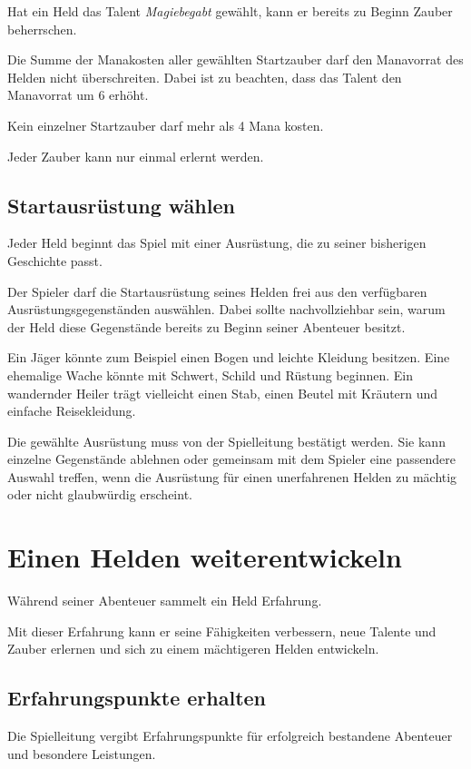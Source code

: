 Hat ein Held das Talent \emph{Magiebegabt} gewählt, kann er bereits zu Beginn Zauber beherrschen.

Die Summe der Manakosten aller gewählten Startzauber darf den Manavorrat des Helden nicht überschreiten. Dabei ist zu beachten, dass das Talent den Manavorrat um 6 erhöht.

Kein einzelner Startzauber darf mehr als 4 Mana kosten.

Jeder Zauber kann nur einmal erlernt werden.

\subsection{Startausrüstung wählen}

Jeder Held beginnt das Spiel mit einer Ausrüstung, die zu seiner bisherigen Geschichte passt.

Der Spieler darf die Startausrüstung seines Helden frei aus den verfügbaren Ausrüstungsgegenständen auswählen. Dabei sollte nachvollziehbar sein, warum der Held diese Gegenstände bereits zu Beginn seiner Abenteuer besitzt.

Ein Jäger könnte zum Beispiel einen Bogen und leichte Kleidung besitzen. Eine ehemalige Wache könnte mit Schwert, Schild und Rüstung beginnen. Ein wandernder Heiler trägt vielleicht einen Stab, einen Beutel mit Kräutern und einfache Reisekleidung.

Die gewählte Ausrüstung muss von der Spielleitung bestätigt werden. Sie kann einzelne Gegenstände ablehnen oder gemeinsam mit dem Spieler eine passendere Auswahl treffen, wenn die Ausrüstung für einen unerfahrenen Helden zu mächtig oder nicht glaubwürdig erscheint.

\section{Einen Helden weiterentwickeln}

Während seiner Abenteuer sammelt ein Held Erfahrung.

Mit dieser Erfahrung kann er seine Fähigkeiten verbessern, neue Talente und Zauber erlernen und sich zu einem mächtigeren Helden entwickeln.

\subsection{Erfahrungspunkte erhalten}

Die Spielleitung vergibt Erfahrungspunkte für erfolgreich bestandene Abenteuer und besondere Leistungen.

